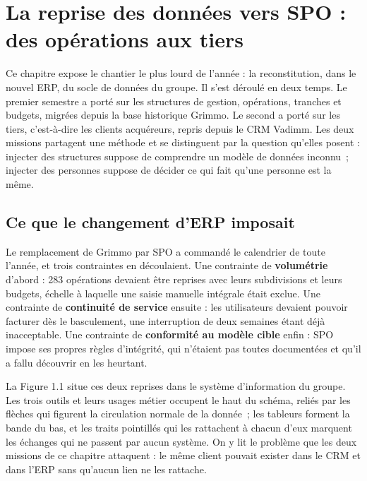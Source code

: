 
\chapter{La reprise des données vers SPO : des opérations aux tiers}
\minitoc
\newpage

Ce chapitre expose le chantier le plus lourd de l'année : la reconstitution, dans le nouvel
ERP, du socle de données du groupe. Il s'est déroulé en deux temps. Le premier semestre a
porté sur les structures de gestion, opérations, tranches et budgets, migrées depuis la base
historique Grimmo. Le second a porté sur les tiers, c'est-à-dire les clients acquéreurs,
repris depuis le CRM Vadimm. Les deux missions partagent une méthode et se distinguent par la
question qu'elles posent : injecter des structures suppose de comprendre un modèle de données
inconnu~; injecter des personnes suppose de décider ce qui fait qu'une personne est la même.

\hypertarget{ce-que-le-changement-derp-imposait}{%
\section{Ce que le changement d'ERP imposait}\label{ce-que-le-changement-derp-imposait}}

Le remplacement de Grimmo par SPO a commandé le calendrier de toute l'année, et trois
contraintes en découlaient. Une contrainte de \textbf{volumétrie} d'abord : 283 opérations devaient
être reprises avec leurs subdivisions et leurs budgets, échelle à laquelle une saisie manuelle
intégrale était exclue. Une contrainte de \textbf{continuité de service} ensuite : les utilisateurs
devaient pouvoir facturer dès le basculement, une interruption de deux semaines étant déjà
inacceptable. Une contrainte de \textbf{conformité au modèle cible} enfin : SPO impose ses propres
règles d'intégrité, qui n'étaient pas toutes documentées et qu'il a fallu découvrir en les
heurtant.

La Figure 1.1 situe ces deux reprises dans le système d'information du groupe. Les trois
outils et leurs usages métier occupent le haut du schéma, reliés par les flèches qui figurent
la circulation normale de la donnée~; les tableurs forment la bande du bas, et les traits
pointillés qui les rattachent à chacun d'eux marquent les échanges qui ne passent par aucun
système. On y lit le problème que les deux missions de ce chapitre attaquent : le même client
pouvait exister dans le CRM et dans l'ERP sans qu'aucun lien ne les rattache.

